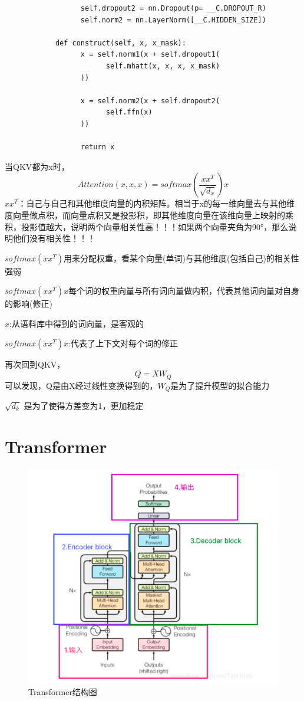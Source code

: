\documentclass[a4paper]{article}
\begin{document}
\begin{sloppypar}
\begin{lstlisting}
                  self.dropout2 = nn.Dropout(p= __C.DROPOUT_R)
                  self.norm2 = nn.LayerNorm([__C.HIDDEN_SIZE])

            def construct(self, x, x_mask):
                  x = self.norm1(x + self.dropout1(
                        self.mhatt(x, x, x, x_mask)
                  ))

                  x = self.norm2(x + self.dropout2(
                        self.ffn(x)
                  ))

                  return x
      \end{lstlisting}

      当QKV都为x时，
      $$
            Attention(x,x,x)=softmax(\frac{xx^T}{\sqrt{d_x}})x
      $$
      $xx^T$：自己与自己和其他维度向量的内积矩阵。相当于x的每一维向量去与其他维度向量做点积，而向量点积又是投影积，即其他维度向量在该维向量上映射的乘积，投影值越大，说明两个向量相关性高！！！如果两个向量夹角为90°，那么说明他们没有相关性！！！

      $softmax(xx^T)$用来分配权重，看某个向量(单词)与其他维度(包括自己)的相关性强弱

      $softmax(xx^T)x$每个词的权重向量与所有词向量做内积，代表其他词向量对自身的影响(修正)

      $x$:从语料库中得到的词向量，是客观的

      $softmax(xx^T)x$:代表了上下文对每个词的修正

      再次回到QKV，
      $$
            Q=XW_Q
      $$
      可以发现，Q是由X经过线性变换得到的，$W_Q$是为了提升模型的拟合能力

      $\sqrt{d_k}$ 是为了使得方差变为1，更加稳定

      \section{Transformer}

      \begin{figure}[ht]
            \centering
            \includegraphics[scale=0.75]{transformer}
            \caption{Transformer结构图}
            \label{Transformer}
      \end{figure}


\end{sloppypar}
\end{document}
